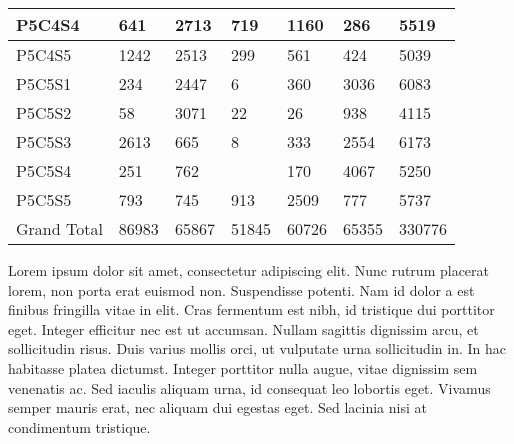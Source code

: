 \begin{longtable}{lllllll}
\multicolumn{1}{|l|}{P5C4S4} & \multicolumn{1}{l|}{641} & \multicolumn{1}{l|}{2713} & \multicolumn{1}{l|}{719} & \multicolumn{1}{l|}{1160} & \multicolumn{1}{l|}{286} & \multicolumn{1}{l|}{5519} \\ \hline
\multicolumn{1}{|l|}{P5C4S5} & \multicolumn{1}{l|}{1242} & \multicolumn{1}{l|}{2513} & \multicolumn{1}{l|}{299} & \multicolumn{1}{l|}{561} & \multicolumn{1}{l|}{424} & \multicolumn{1}{l|}{5039} \\ \hline
\multicolumn{1}{|l|}{P5C5S1} & \multicolumn{1}{l|}{234} & \multicolumn{1}{l|}{2447} & \multicolumn{1}{l|}{6} & \multicolumn{1}{l|}{360} & \multicolumn{1}{l|}{3036} & \multicolumn{1}{l|}{6083} \\ \hline
\multicolumn{1}{|l|}{P5C5S2} & \multicolumn{1}{l|}{58} & \multicolumn{1}{l|}{3071} & \multicolumn{1}{l|}{22} & \multicolumn{1}{l|}{26} & \multicolumn{1}{l|}{938} & \multicolumn{1}{l|}{4115} \\ \hline
\multicolumn{1}{|l|}{P5C5S3} & \multicolumn{1}{l|}{2613} & \multicolumn{1}{l|}{665} & \multicolumn{1}{l|}{8} & \multicolumn{1}{l|}{333} & \multicolumn{1}{l|}{2554} & \multicolumn{1}{l|}{6173} \\ \hline
\multicolumn{1}{|l|}{P5C5S4} & \multicolumn{1}{l|}{251} & \multicolumn{1}{l|}{762} & \multicolumn{1}{l|}{} & \multicolumn{1}{l|}{170} & \multicolumn{1}{l|}{4067} & \multicolumn{1}{l|}{5250} \\ \hline
\multicolumn{1}{|l|}{P5C5S5} & \multicolumn{1}{l|}{793} & \multicolumn{1}{l|}{745} & \multicolumn{1}{l|}{913} & \multicolumn{1}{l|}{2509} & \multicolumn{1}{l|}{777} & \multicolumn{1}{l|}{5737} \\ \hline
Grand Total & 86983 & 65867 & 51845 & 60726 & 65355 & 330776 \\ \hline
\end{longtable}

Lorem ipsum dolor sit amet, consectetur adipiscing elit. Nunc rutrum placerat lorem, non porta erat euismod non. Suspendisse potenti. Nam id dolor a est finibus fringilla vitae in elit. Cras fermentum est nibh, id tristique dui porttitor eget. Integer efficitur nec est ut accumsan. Nullam sagittis dignissim arcu, et sollicitudin risus. Duis varius mollis orci, ut vulputate urna sollicitudin in. In hac habitasse platea dictumst. Integer porttitor nulla augue, vitae dignissim sem venenatis ac. Sed iaculis aliquam urna, id consequat leo lobortis eget. Vivamus semper mauris erat, nec aliquam dui egestas eget. Sed lacinia nisi at condimentum tristique.

